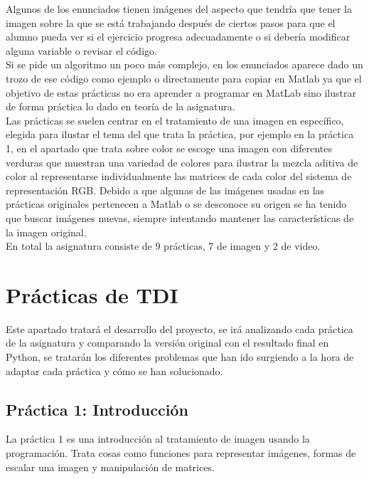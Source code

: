 \documentclass[a4paper,12pt]{report}
\begin{document}
Algunos de los enunciados tienen imágenes del aspecto que tendría que tener la imagen sobre la que se está trabajando después de ciertos pasos para que el alumno pueda ver si el ejercicio progresa adecuadamente o si debería modificar alguna variable o revisar el código.\\

Si se pide un algoritmo un poco más complejo, en los enunciados aparece dado un trozo de ese código como ejemplo o directamente para copiar en Matlab ya que el objetivo de estas prácticas no era aprender a programar en MatLab sino ilustrar de forma práctica lo dado en teoría de la asignatura.\\

Las prácticas se suelen centrar en el tratamiento de una imagen en específico, elegida para ilustar el tema del que trata la práctica, por ejemplo en la práctica 1, en el apartado que trata sobre color se escoge una imagen con diferentes verduras que muestran una variedad de colores para ilustrar la mezcla aditiva de color al representarse individualmente las matrices de cada color del sistema de representación RGB. Debido a que algunas de las imágenes usadas en las prácticas originales pertenecen a Matlab o se desconoce su origen se ha tenido que buscar imágenes nuevas, siempre intentando mantener las características de la imagen original.\\

En total la asignatura consiste de 9 prácticas, 7 de imagen y 2 de video. \\

\chapter{Prácticas de TDI}

Este apartado tratará el desarrollo del proyecto, se irá analizando cada práctica de la asignatura y comparando la versión original con el resultado final en Python, se tratarán los diferentes problemas que han ido surgiendo a la hora de adaptar cada práctica y cómo se han solucionado.\\

\section{ Práctica 1: Introducción}

La práctica 1 es una introducción al tratamiento de imagen usando la programación. Trata cosas como funciones para representar imágenes, formas de escalar una imagen y manipulación de matrices.\\
\end{document}
